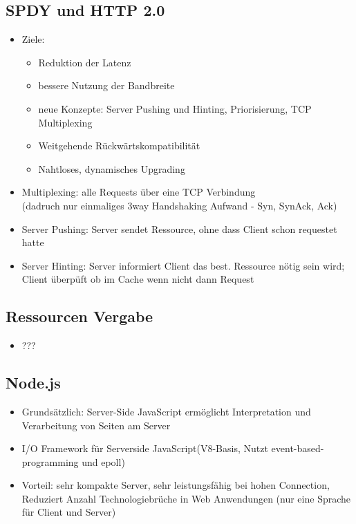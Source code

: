 \documentclass{article} %
\begin{document}
	\subsection{SPDY und HTTP 2.0}
	\begin{itemize}
		\item Ziele:
		\begin{itemize}
			\item Reduktion der Latenz
			\item bessere Nutzung der Bandbreite
			\item neue Konzepte: Server Pushing und Hinting, Priorisierung, TCP Multiplexing
			\item Weitgehende Rückwärtskompatibilität
			\item Nahtloses, dynamisches Upgrading
		\end{itemize}
		\item Multiplexing: alle Requests über eine TCP Verbindung\\ (dadruch nur einmaliges 3way Handshaking Aufwand - Syn, SynAck, Ack)
		\item Server Pushing: Server sendet Ressource, ohne dass Client schon requestet hatte
		\item Server Hinting: Server informiert Client das best. Ressource nötig sein wird; Client überpüft ob im Cache wenn nicht dann Request
	\end{itemize}
	\subsection{Ressourcen Vergabe}
	\begin{itemize}
		\item ???
	\end{itemize}
	\subsection{Node.js}
	\begin{itemize}
	\item Grundsätzlich: Server-Side JavaScript ermöglicht Interpretation und Verarbeitung von Seiten am Server
		\item I/O Framework für Serverside JavaScript(V8-Basis, Nutzt event-based-programming und epoll)
		\item Vorteil: sehr kompakte Server, sehr leistungsfähig bei hohen Connection, Reduziert Anzahl Technologiebrüche in Web Anwendungen (nur eine Sprache für Client und Server)
	\end{itemize}
\end{document}

